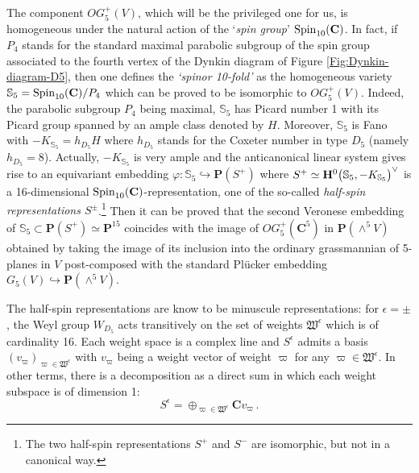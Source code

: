 \documentclass[11pt]{amsart}
\newcommand{\sk}{\smallskip}
\begin{document}
The component $OG^+_5(V)$, which will be the privileged one for us, is homogeneous under the natural action of the `{\it spin group}' ${\rm Spin}_{10}(\mathbf C)$. In fact, if $P_4$ stands for the standard maximal parabolic subgroup of the spin group associated to the fourth vertex of the Dynkin diagram of Figure \ref{Fig:Dynkin-diagram-D5}, then 
one defines the  {\it `spinor 10-fold'} as the homogeneous variety 
$\mathbb S_5={\rm Spin}_{10}(\mathbf C)/P_4$ which can be proved to be isomorphic to 
$OG^+_5(V)$. Indeed, the parabolic subgroup $P_4$ being maximal, $\mathbb S_5$ has Picard number 1 with its Picard group spanned by an ample class denoted by $H$. Moreover, 
$\mathbb S_5$ is Fano with $-K_{\mathbb S_5}=h_{D_5} H$ where $h_{D_5}$ stands for the Coxeter number in type $D_5$ (namely $h_{D_5}=8$). Actually, $-K_{\mathbb S_5}$ is very ample and the anticanonical linear system %
gives rise to an equivariant embedding  
$\varphi : \mathbb S_5 \hookrightarrow \mathbf P(S^+)$ where $S^+\simeq {\bf H}^0\big( 
\mathbb S_5, -K_{\mathbb S_5}\big)^\vee$ is a 16-dimensional ${\rm Spin}_{10}(\mathbf C)$-representation, one of the so-called {\it half-spin representations $S^{\pm}$}.\footnote{The two half-spin representations $S^+$ and $S^-$ are isomorphic, but not in a canonical way.} Then it can be proved that the second Veronese embedding of $
{\mathbb S_5}\subset \mathbf P(S^+)\simeq \mathbf P^{15}$ coincides with the image of $OG_5^+(\mathbf C^5)$ in $\mathbf P(\wedge^5 V)$ obtained by taking the image of its inclusion into the ordinary grassmannian of 5-planes in $V$ 
 post-composed with the standard Pl\"ucker embedding $G_5(V)\hookrightarrow \mathbf P(\wedge^5 V)$. 
\sk 

The half-spin representations are know to be minuscule representations:  for $\epsilon =\pm$, 
the Weyl group $W_{D_5}$ acts transitively on the set of weights $\mathfrak W^\epsilon$ which is of cardinality 16. Each weight space is a complex line and $S^\epsilon$ admits a basis $(v_\varpi)_{\varpi \in \mathfrak W^\epsilon}$ with $v_\varpi$ being a weight vector of weight $\varpi$ for any $\varpi\in \mathfrak W^\epsilon$.  In other terms, there is a decomposition as a direct sum in which each weight subspace is of dimension 1:
\begin{equation}
\label{Eq:S+-direct-sum}
S^\epsilon=\oplus_{\varpi \in \mathfrak W^\epsilon}  \mathbf C v_\varpi
\, .
\end{equation}
\end{document}
